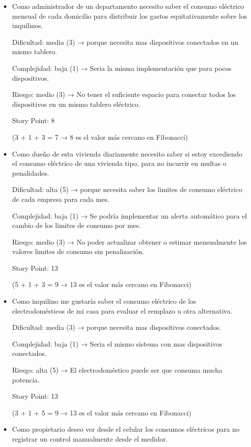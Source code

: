 \documentclass[
11pt, %
]{charter}
\begin{document}
\begin{itemize}

\item{Como administrador  de un departamento necesito saber el consumo eléctrico mensual de cada domicilio para distribuir los gastos equitativamente sobre los inquilinos.}


Dificultad: media (3) → porque necesita mas dispositivos conectados en un mismo tablero.

Complejidad: baja (1) → Seria la misma implementación que para pocos dispositivos.

Riesgo: medio (3) → No tener el suficiente espacio para conectar todos los dispositivos en un mismo tablero eléctrico.

Story Point: 8 

(3 + 1 + 3 = 7 → 8 es el valor más cercano en Fibonacci)


\item{Como dueño de esta vivienda diariamente necesito saber  si estoy excediendo  el consumo eléctrico de una vivienda tipo, para no incurrir en multas o penalidades.
}

Dificultad: alta (5) → porque necesita saber los limites de consumo eléctrico de cada empresa para cada mes.

Complejidad: baja (1) → Se podría implementar un alerta automático para el cambio de los limites de consumo por mes. 

Riesgo: medio (3) → No poder actualizar obtener o estimar mensualmente los valores limites de consumo sin penalización. 

Story Point: 13 

(5 + 1 + 3 = 9 → 13 es el valor más cercano en Fibonacci)

\item{Como inquilino me gustaría saber el consumo eléctrico de los electrodomésticos de mi casa para evaluar el remplazo u otra alternativa.
}

Dificultad: media (3) → porque necesita mas dispositivos conectados.

Complejidad: baja (1) → Seria el mismo sistema con mas dispositivos conectados.

Riesgo: alta (5) → El electrodoméstico puede ser que consuma mucha potencia.

Story Point: 13 

(3 + 1 + 5 = 9 → 13 es el valor más cercano en Fibonacci)

\item{Como propietario deseo ver desde el celular los consumos eléctricos para no registrar un control manualmente desde el medidor.}



\end{itemize}
\end{document}
